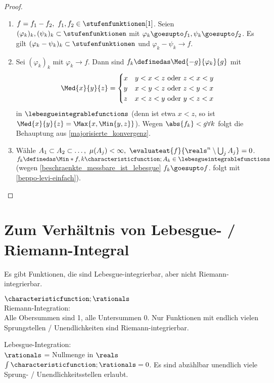 \begin{proof}\ 
    
    \begin{enumerate}
        \item \(f=f_1-f_2,\ f_1,f_2\in\stufenfunktionen[1]\). Seien \((\varphi_k)_k,(\psi_k)_k\subset \stufenfunktionen\) mit \(\varphi_k\goesupto f_1,\psi_k\goesupto f_2\).
        Es gilt \((\varphi_k-\psi_k)_k\subset\stufenfunktionen\) und \(\varphi_k-\psi_k\to f\).
        
        \item Sei \((\varphi_k)_k\) mit \(\varphi_k\to f\). Dann sind \(f_k\definedas \Med{-g}{\varphi_k}{g}\) mit 
        \begin{equation*}
          \Med{x}{y}{z}=\begin{cases}
                x & y<x<z\text{ oder } z<x<y\\
                y & x<y<z\text{ oder } z<y<x\\
                z & x<z<y\text{ oder } y<z<x\\
            \end{cases}
        \end{equation*}
        in \(\lebesgueintegrablefunctions\) (denn ist etwa \(x<z\), so ist \(\Med{x}{y}{z}=\Max{x,\Min{y,z}}\)).
        Wegen \(\abs{f_k}<g\forall k\) folgt die Behauptung aus \ref{majorisierte_konvergenz}.
        \item Wähle \(A_1\subset A_2\subset\ldots,\ \mu(A_j)<\infty,\ \evaluateat{f}{\reals^n\setminus \bigcup_j A_j}=0\).
        \(f_k\definedas \Min*{f,k\characteristicfunction;{A_k}}\in \lebesgueintegrablefunctions\) (wegen \ref{beschraenkte_messbare_ist_lebesgue} \(f_k\goesupto f\). \Beh folgt mit \ref{beppo-levi-einfach}).
    \end{enumerate}
\end{proof}


\section{Zum Verhältnis von Lebesgue- / Riemann-Integral}

Es gibt Funktionen, die sind Lebesgue-integrierbar, aber nicht Riemann-integrierbar.
\begin{beispiel*}
    \(\characteristicfunction;{\rationals}\)\\
    Riemann-Integration:\\
        Alle Obersummen sind 1, alle Untersummen 0. Nur Funktionen mit endlich vielen Sprungstellen / Unendlichkeiten sind Riemann-integrierbar.

    Lebesgue-Integration:\\
        \( \rationals \) = Nullmenge in \( \reals \)\timplies\(\int\characteristicfunction;{\rationals}=0\). Es sind abzählbar unendlich viele Sprung- / Unendlichkeitsstellen erlaubt.
\end{beispiel*}

